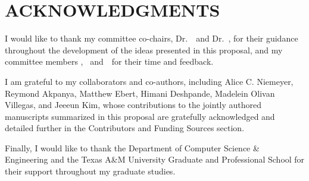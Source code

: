 %
%
%


\chapter*{ACKNOWLEDGMENTS}

\indent I would like to thank my committee co-chairs, Dr.~\tamuchairone~and Dr.~\tamuchairtwo, for their guidance throughout the development of the ideas presented in this proposal, and my committee members \tamumemberone, \tamumembertwo~and~\tamumemberthree~for their time and feedback.

I am grateful to my collaborators and co-authors, including Alice C. Niemeyer, Reymond Akpanya, Matthew Ebert, Himani Deshpande, Madelein Olivan Villegas, and Jeeeun Kim, whose contributions to the jointly authored manuscripts summarized in this proposal are gratefully acknowledged and detailed further in the Contributors and Funding Sources section.

Finally, I would like to thank the Department of Computer Science \& Engineering and the Texas A\&M University Graduate and Professional School for their support throughout my graduate studies.

\pagebreak{}
